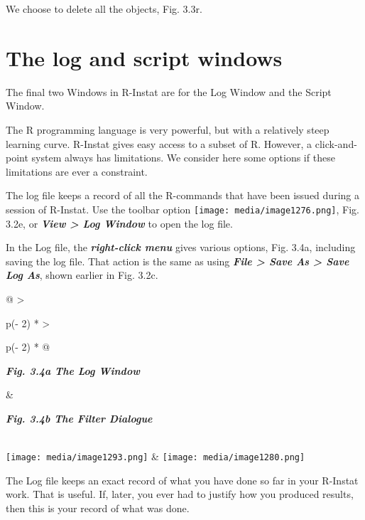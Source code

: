 \documentclass[
  letterpaper,
  DIV=11,
  numbers=noendperiod]{scrreprt}
\begin{document}
We choose to delete all the objects, Fig. 3.3r.

\section{The log and script windows}\label{the-log-and-script-windows}

The final two Windows in R-Instat are for the Log Window and the Script
Window.

The R programming language is very powerful, but with a relatively steep
learning curve. R-Instat gives easy access to a subset of R. However, a
click-and-point system always has limitations. We consider here some
options if these limitations are ever a constraint.

The log file keeps a record of all the R-commands that have been issued
during a session of R-Instat. Use the toolbar option
\texttt{[image: media/image1276.png]},
Fig. 3.2e, or \textbf{\emph{View \textgreater{} Log Window}} to open the
log file.

In the Log file, the \textbf{\emph{right-click menu}} gives various
options, Fig. 3.4a, including saving the log file. That action is the
same as using \textbf{\emph{File \textgreater{} Save As \textgreater{}
Save Log As}}, shown earlier in Fig. 3.2c.

\begin{longtable}[]{@{}
  >{\raggedright\arraybackslash}p{(\columnwidth - 2\tabcolsep) * }
  >{\raggedright\arraybackslash}p{(\columnwidth - 2\tabcolsep) * }@{}}
\toprule\noalign{}
\begin{minipage}[b]{\linewidth}\raggedright
\textbf{\emph{Fig. 3.4a The Log Window}}
\end{minipage} & \begin{minipage}[b]{\linewidth}\raggedright
\textbf{\emph{Fig. 3.4b The Filter Dialogue}}
\end{minipage} \\
\midrule\noalign{}
\endhead
\bottomrule\noalign{}
\endlastfoot
\texttt{[image: media/image1293.png]} &
\texttt{[image: media/image1280.png]} \\
\end{longtable}

The Log file keeps an exact record of what you have done so far in your
R-Instat work. That is useful. If, later, you ever had to justify how
you produced results, then this is your record of what was done.
\end{document}
